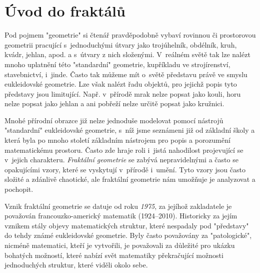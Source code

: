 \chapter{Úvod do fraktálů}\label{chapter:uvod_do_fraktalu}

Pod pojmem "geometrie" si čtenář pravděpodobně vybaví rovinnou či prostorovou geometrii pracující s~jednoduchými útvary jako trojúhelník, obdélník, kruh, kvádr, jehlan, apod. a s~útvary z nich složenými. V~reálném světě tak lze nalézt mnoho uplatnění této "standardní" geometrie, kupříkladu ve strojírenství, stavebnictví, i~jinde. Často tak můžeme mít o~světě představu právě ve smyslu eukleidovské geometrie. Lze však nalézt řadu objektů, pro jejichž popis tyto představy jsou limitující. Např. v~přírodě mrak nelze popsat jako kouli, horu nelze popsat jako jehlan a ani pobřeží nelze určitě popsat jako kružnici.\par

Mnohé přírodní obrazce již nelze jednoduše modelovat pomocí nástrojů "standardní" eukleidovské geometrie, s~níž jsme seznámeni již od základní školy a která byla po mnoho století základním nástrojem pro popis a porozumění matematickému prostoru. Často zde hraje roli i~jistá nahodilost projevující se v~jejich charakteru. \emph{Fraktální geometrie} se zabývá nepravidelnými a často se opakujícími vzory, které se vyskytují v~přírodě i~umění. Tyto vzory jsou často složité a zdánlivě chaotické, ale fraktální geometrie nám umožňuje je analyzovat a pochopit.\par

Vznik fraktální geometrie se datuje od roku \emph{1975}, za jejíhož zakladatele je považován francouzko-americký matematik  \mbox{(1924--2010)}. Historicky za jejím vznikem stály objevy matematických struktur, které nespadaly pod "představy" do tehdy známé eukleidovské geometrie. Byly často považovány za "patologické", nicméně matematici, kteří je vytvořili, je považovali za důležité pro ukázku bohatých možností, které nabízí svět matematiky překračující možnosti jednoduchých struktur, které viděli okolo sebe. \citep[str. 33]{Mandelbrot1983}




